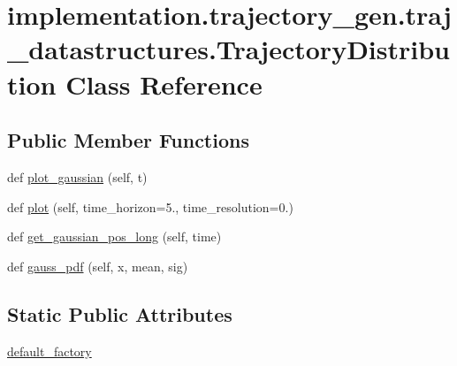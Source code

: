 \hypertarget{classimplementation_1_1trajectory__gen_1_1traj__datastructures_1_1_trajectory_distribution}{}\section{implementation.\+trajectory\+\_\+gen.\+traj\+\_\+datastructures.\+Trajectory\+Distribution Class Reference}
\label{classimplementation_1_1trajectory__gen_1_1traj__datastructures_1_1_trajectory_distribution}
\subsection*{Public Member Functions}
\begin{DoxyCompactItemize}
\item 
def \hyperlink{classimplementation_1_1trajectory__gen_1_1traj__datastructures_1_1_trajectory_distribution_a96a1bc5e051ef83cc606441c3632865a}{plot\+\_\+gaussian} (self, t)
\item 
def \hyperlink{classimplementation_1_1trajectory__gen_1_1traj__datastructures_1_1_trajectory_distribution_a54237ce266be1f816ddcb2dfacc0b86b}{plot} (self, time\+\_\+horizon=5., time\+\_\+resolution=0.)
\item 
def \hyperlink{classimplementation_1_1trajectory__gen_1_1traj__datastructures_1_1_trajectory_distribution_ae23af4dca3b5ab18b1c29812e106bc2e}{get\+\_\+gaussian\+\_\+pos\+\_\+long} (self, time)
\item 
def \hyperlink{classimplementation_1_1trajectory__gen_1_1traj__datastructures_1_1_trajectory_distribution_a9660a2684fc2687d344165dc833cd672}{gauss\+\_\+pdf} (self, x, mean, sig)
\end{DoxyCompactItemize}
\subsection*{Static Public Attributes}
\begin{DoxyCompactItemize}
\item 
\hyperlink{classimplementation_1_1trajectory__gen_1_1traj__datastructures_1_1_trajectory_distribution_aee557a3a22b79a6269ee9a71398b644d}{default\+\_\+factory}
\end{DoxyCompactItemize}


